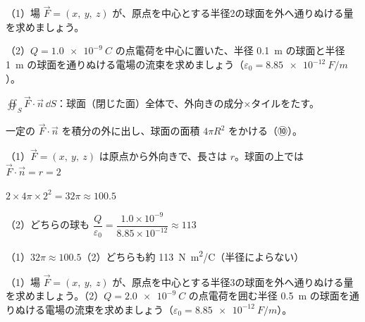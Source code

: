 \begin{reidai}
（1）場 $\vec F=(x,\ y,\ z)$ が、原点を中心とする半径2の球面を外へ通りぬける量を求めましょう。\par
（2）$Q=\qty{1.0e-9}{C}$ の点電荷を中心に置いた、半径 \qty{0.1}{m} の球面と半径 \qty{1}{m} の球面を通りぬける電場の流束を求めましょう（$\varepsilon_0=\qty{8.85e-12}{F/m}$）。\par
\kangaekata {}\par
{}\enspace $\displaystyle\oiint_S\vec F\cdot\vec n\,\dd S$：球面（閉じた面）全体で、外向きの成分×タイルをたす。\par
{}\enspace 一定の $\vec F\cdot\vec n$ を積分の外に出し、球面の面積 $4\pi R^2$ をかける（⑩）。\par
\shiki\kviiiis{}\zw{} （1）$\vec F=(x,\ y,\ z)$ は原点から外向きで、長さは $r$。球面の上では $\vec F\cdot\vec n=r=2$\par
\kviiiib $2\times4\pi\times2^2=32\pi\approx100.5$\par
\kviiiia （2）どちらの球も $\dfrac{Q}{\varepsilon_0}=\dfrac{1.0\times10^{-9}}{8.85\times10^{-12}}\approx113$\par
\kotae\kviiiis{}\zw{} （1）$32\pi\approx100.5$\quad （2）どちらも約 \qty{113}{N.m^2/C}（半径によらない）
\end{reidai}

\begin{jibun}
（1）場 $\vec F=(x,\ y,\ z)$ が、原点を中心とする半径3の球面を外へ通りぬける量を求めましょう。（2）$Q=\qty{2.0e-9}{C}$ の点電荷を囲む半径 \qty{0.5}{m} の球面を通りぬける電場の流束を求めましょう（$\varepsilon_0=\qty{8.85e-12}{F/m}$）。
\end{jibun}

